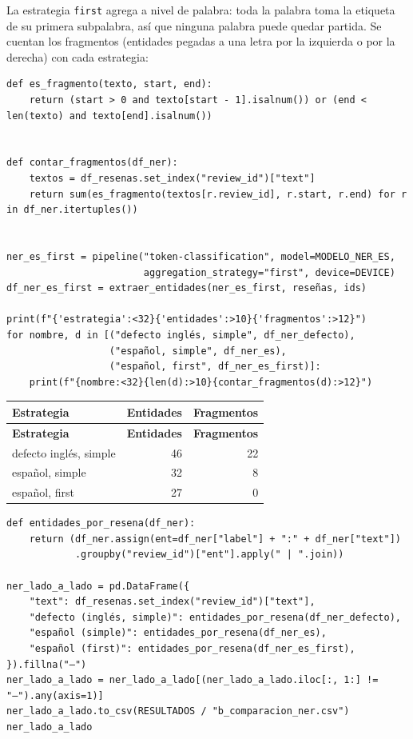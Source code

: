 \documentclass[12pt,a4paper]{article}
\begin{document}
La estrategia \texttt{first} agrega a nivel de palabra: toda la palabra toma la etiqueta de su
primera subpalabra, así que ninguna palabra puede quedar partida. Se cuentan los fragmentos
(entidades pegadas a una letra por la izquierda o por la derecha) con cada estrategia:

\begin{lstlisting}[style=codigo]
def es_fragmento(texto, start, end):
    return (start > 0 and texto[start - 1].isalnum()) or (end < len(texto) and texto[end].isalnum())


def contar_fragmentos(df_ner):
    textos = df_resenas.set_index("review_id")["text"]
    return sum(es_fragmento(textos[r.review_id], r.start, r.end) for r in df_ner.itertuples())


ner_es_first = pipeline("token-classification", model=MODELO_NER_ES,
                        aggregation_strategy="first", device=DEVICE)
df_ner_es_first = extraer_entidades(ner_es_first, reseñas, ids)

print(f"{'estrategia':<32}{'entidades':>10}{'fragmentos':>12}")
for nombre, d in [("defecto inglés, simple", df_ner_defecto),
                  ("español, simple", df_ner_es),
                  ("español, first", df_ner_es_first)]:
    print(f"{nombre:<32}{len(d):>10}{contar_fragmentos(d):>12}")
\end{lstlisting}

{\small\renewcommand{\arraystretch}{1.3}
\begin{longtable}{|l|r|r|}
\hline
\textbf{Estrategia} & \textbf{Entidades} & \textbf{Fragmentos} \\ \hline
\endfirsthead
\hline
\textbf{Estrategia} & \textbf{Entidades} & \textbf{Fragmentos} \\ \hline
\endhead
defecto inglés, simple & 46 & 22 \\ \hline
español, simple & 32 & 8 \\ \hline
español, first & 27 & 0 \\ \hline
\end{longtable}}

\begin{lstlisting}[style=codigo]
def entidades_por_resena(df_ner):
    return (df_ner.assign(ent=df_ner["label"] + ":" + df_ner["text"])
            .groupby("review_id")["ent"].apply(" | ".join))

ner_lado_a_lado = pd.DataFrame({
    "text": df_resenas.set_index("review_id")["text"],
    "defecto (inglés, simple)": entidades_por_resena(df_ner_defecto),
    "español (simple)": entidades_por_resena(df_ner_es),
    "español (first)": entidades_por_resena(df_ner_es_first),
}).fillna("—")
ner_lado_a_lado = ner_lado_a_lado[(ner_lado_a_lado.iloc[:, 1:] != "—").any(axis=1)]
ner_lado_a_lado.to_csv(RESULTADOS / "b_comparacion_ner.csv")
ner_lado_a_lado
\end{lstlisting}
\end{document}
